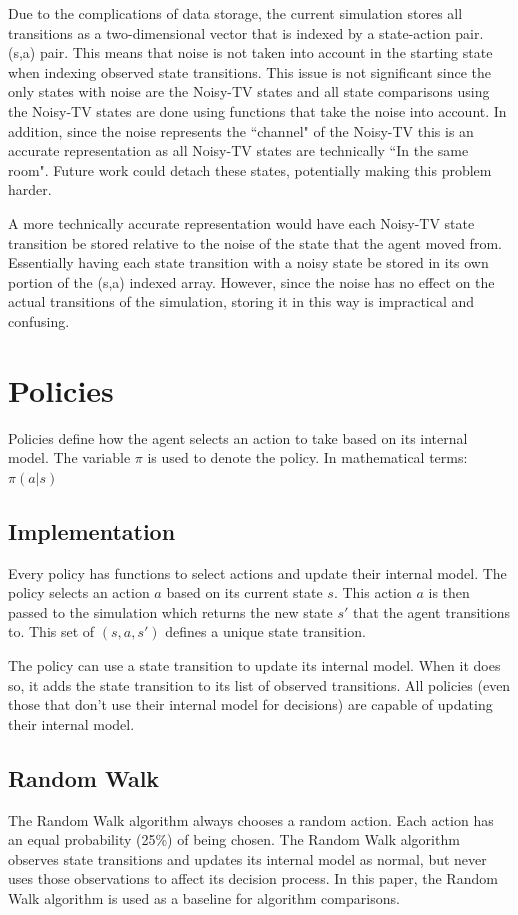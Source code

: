 \documentclass[12pt]{thesis}
\begin{document}
Due to the complications of data storage, the current simulation stores all transitions as a two-dimensional vector that is indexed by a state-action pair. (s,a) pair. This means that noise is not taken into account in the starting state when indexing observed state transitions. This issue is not significant since the only states with noise are the Noisy-TV states and all state comparisons using the Noisy-TV states are done using functions that take the noise into account. In addition, since the noise represents the ``channel" of the Noisy-TV this is an accurate representation as all Noisy-TV states are technically ``In the same room". Future work could detach these states, potentially making this problem harder.

A more technically accurate representation would have each Noisy-TV state transition be stored relative to the noise of the state that the agent moved from. Essentially having each state transition with a noisy state be stored in its own portion of the (s,a) indexed array. However, since the noise has no effect on the actual transitions of the simulation, storing it in this way is impractical and confusing.

\section{Policies}
Policies define how the agent selects an action to take based on its internal model. The variable $\pi$ is used to denote the policy. In mathematical terms: $\pi(a | s)$
\subsection{Implementation}
Every policy has functions to select actions and update their internal model. The policy selects an action $a$ based on its current state $s$. This action $a$ is then passed to the simulation which returns the new state $s'$ that the agent transitions to. This set of $(s,a,s')$ defines a unique state transition.

The policy can use a state transition to update its internal model. When it does so, it adds the state transition to its list of observed transitions. All policies (even those that don't use their internal model for decisions) are capable of updating their internal model.
\subsection{Random Walk}
The Random Walk algorithm always chooses a random action. Each action has an equal probability (25\%) of being chosen. The Random Walk algorithm observes state transitions and updates its internal model as normal, but never uses those observations to affect its decision process. In this paper, the Random Walk algorithm is used as a baseline for algorithm comparisons.
\end{document}
